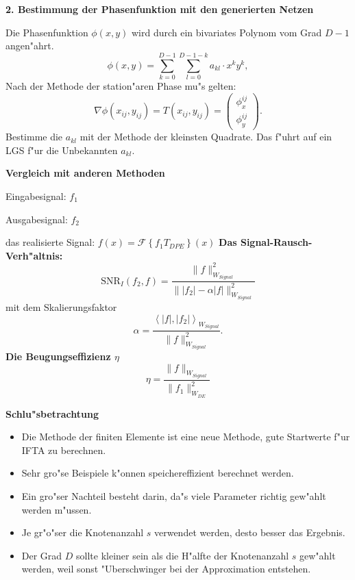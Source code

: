 \documentclass[11pt,a4paper]{article}
\newcommand{\betrag}[1]{|#1|}
\newcommand{\norm}[1]{\parallel #1 \parallel_{W_{Signal}}}
\newcommand{\snr}[2]{\mbox{SNR}_I ( #1, #2 )}
\newcommand{\skalar}[2]{\left< #1, #2 \right>_{W_{Signal}}}
\begin{document}
\newpage
  \begin{center}
    {\huge\bf 2. Bestimmung der Phasenfunktion mit den generierten Netzen}
  \end{center}
  \vfill
  Die Phasenfunktion $\phi(x,y)$ wird durch ein bivariates Polynom vom 
  Grad $D-1$ angen"ahrt.
  $$ \phi(x,y) = \sum_{k=0}^{D-1}\sum_{l=0}^{D-1-k} a_{kl}\cdot x^k y^k, $$    
  \vfill
  Nach der Methode der station"aren Phase mu"s gelten:
  $$ \nabla \phi(x_{ij},y_{ij}) = T(x_{ij},y_{ij}) = \begin{pmatrix} \phi_x^{ij} \\ \phi_y^{ij}\end{pmatrix}. $$
  \vfill
  Bestimme die $a_{kl}$ mit der
  Methode der kleinsten Quadrate.  Das f"uhrt auf ein LGS f"ur die Unbekannten $a_{kl}$.
  \vfill

\newpage
  \begin{center}
    {\huge\bf Vergleich mit anderen Methoden}
  \end{center}
  \vfill
  Eingabesignal: $f_1$

  Ausgabesignal: $f_2$

  das realisierte Signal: $ f(x)=\mathcal{F}\left\{f_1 T_{DPE}\right\}(x) $
  \vfill
  {\bf Das Signal-Rausch-Verh"altnis:}
  $$ \snr{f_2}{f} = \frac{\norm{f}^2} {\norm{\betrag{f_2}-\alpha\betrag{f}}^2} $$
  mit dem Skalierungsfaktor
  $$ \alpha = \frac{\skalar{\betrag{f}}{\betrag{f_2}}}{\norm{f}^2}. $$
  \vfill
  {\bf Die Beugungseffizienz $\eta$}
  $$ \eta = \frac{\norm{f}}{\parallel f_1 \parallel_{W_{DE}}^2} $$
  \vfill

\newpage
  \begin{center}
    {\huge\bf Schlu"sbetrachtung}
  \end{center}
  \vfill
  \begin{itemize}
    \item Die Methode der finiten Elemente ist eine neue Methode, gute Startwerte f"ur 
      IFTA zu berechnen.
      \vfill
    \item Sehr gro"se Beispiele k"onnen speichereffizient berechnet werden.
      \vfill
    \item Ein gro"ser Nachteil besteht darin, da"s viele Parameter richtig gew"ahlt werden
      m"ussen.
      \vfill
    \item Je gr"o"ser die Knotenanzahl $s$ verwendet werden, desto besser das Ergebnis.
      \vfill
    \item Der Grad $D$ sollte kleiner sein als die H"alfte der Knotenanzahl $s$
      gew"ahlt werden, weil sonst "Uberschwinger bei der Approximation entstehen.
   \end{itemize}
   \vfill
\end{document}
